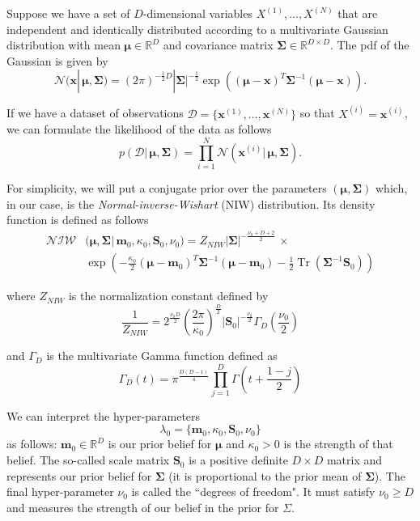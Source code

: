 \documentclass[final,3p,times,twocolumn]{elsarticle}
\DeclareMathOperator*{\Tr}{Tr}
\let\bs\boldsymbol
\begin{document}
Suppose we have a set of $D$-dimensional variables $X^{(1)},\dots,X^{(N)}$ that are independent and identically distributed according to a multivariate Gaussian distribution with mean $\bs\mu \in \mathbb{R}^D$ and covariance matrix $\bs\Sigma \in \mathbb{R}^{D\times D}$. 
The pdf of the Gaussian is given by
\begin{equation}
\mathcal{N}(\bs x|\,\bs\mu,\bs\Sigma) = (2\pi)^{-\frac{1}{2}D}|\bs\Sigma|^{-\frac{1}{2}} \exp \left((\bs\mu-\bs x)^T \bs\Sigma^{-1} (\bs\mu-\bs x) \right).
\end{equation}

If we have a dataset of observations $\mathcal{D} = \{\bs x^{(1)},\dots,\bs x^{(N)}\}$ so that $X^{(i)} = \bs x^{(i)}$, we can formulate the likelihood of the data as follows
\begin{equation}
p(\mathcal{D}|\,\bs\mu,\bs\Sigma) = \prod_{i=1}^N \mathcal{N}(\bs x^{(i)}|\,\bs \mu,\bs \Sigma).
\end{equation}

For simplicity, we will put a conjugate prior over the parameters $(\bs\mu,\bs\Sigma)$ which, in our case, is the \emph{Normal-inverse-Wishart} (NIW) distribution.
Its density function is defined as follows
\begin{equation}
\begin{split}
\mathcal{NIW}&(\bs\mu,\bs\Sigma|\,\bs m_0,\kappa_0,\bs S_0,\nu_0) = Z_{NIW}|\bs\Sigma|^{-\frac{\nu_0+D+2}{2}} \,\times\\
& \exp\left(-\frac{\kappa_0}{2}(\bs\mu-\bs m_0)^T\bs\Sigma^{-1}(\bs\mu-\bs m_0) -\frac{1}{2}\Tr(\bs\Sigma^{-1}\bs S_0) \right)
\end{split}
\end{equation}

where $Z_{NIW}$ is the normalization constant defined by
\begin{equation}
\frac{1}{Z_{NIW}} = 2^{\frac{\nu_0 D}{2}}\left(\frac{2\pi}{\kappa_0}\right)^{\frac{D}{2}}|\bs S_0|^{-\frac{\nu_0}{2}}\Gamma_D \left(\frac{\nu_0}{2}\right)
\end{equation}

and $\Gamma_D$ is the multivariate Gamma function defined as
\begin{equation}
\Gamma_D(t) = \pi^{\frac{D(D-1)}{4}} \prod_{j=1}^D \Gamma\left(t + \frac{1-j}{2}\right)
\end{equation}

We can interpret the hyper-parameters
\begin{equation*}
\lambda_0 = \{\bs m_0,\kappa_0,\bs S_0,\nu_0\}
\end{equation*}
as follows:
$\bs m_0 \in \mathbb{R}^D$ is our prior belief for $\bs \mu$ and $\kappa_0 > 0$ is the strength of that belief.
The so-called scale matrix $\bs S_0$ is a positive definite $D\times D$ matrix and represents our prior belief for $\bs \Sigma$ (it is proportional to the prior mean of $\bs\Sigma$).
The final hyper-parameter $\nu_0$ is called the ``degrees of freedom".
It must satisfy $\nu_0 \geq D$ and measures the strength of our belief in the prior for $\Sigma$.
\end{document}
